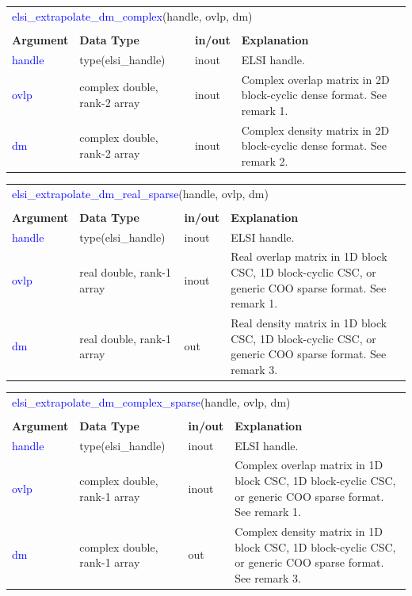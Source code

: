 \documentclass{report}
\newcommand{\tcb}[1]{\textcolor{blue}{#1}}
\begin{document}
\begin{tabular}[]{|p{20mm}|p{45mm}|p{15mm}|p{85mm}|}
\multicolumn{4}{l}{\tcb{elsi\_extrapolate\_dm\_complex}(handle, ovlp, dm)}\\
\multicolumn{4}{l}{}\\
\hline
\multicolumn{1}{|l|}{\textbf{Argument}} & \multicolumn{1}{l|}{\textbf{Data Type}} & \multicolumn{1}{l|}{\textbf{in/out}} & \multicolumn{1}{l|}{\textbf{Explanation}}\\
\hline
\tcb{handle} & type(elsi\_handle)           & inout & ELSI handle.\\
\hline
\tcb{ovlp}   & complex double, rank-2 array & inout & Complex overlap matrix in 2D block-cyclic dense format. See remark 1.\\
\hline
\tcb{dm}     & complex double, rank-2 array & inout & Complex density matrix in 2D block-cyclic dense format. See remark 2.\\
\hline
\end{tabular}

\begin{tabular}[]{|p{20mm}|p{45mm}|p{15mm}|p{85mm}|}
\multicolumn{4}{l}{\tcb{elsi\_extrapolate\_dm\_real\_sparse}(handle, ovlp, dm)}\\
\multicolumn{4}{l}{}\\
\hline
\multicolumn{1}{|l|}{\textbf{Argument}} & \multicolumn{1}{l|}{\textbf{Data Type}} & \multicolumn{1}{l|}{\textbf{in/out}} & \multicolumn{1}{l|}{\textbf{Explanation}}\\
\hline
\tcb{handle} & type(elsi\_handle)        & inout & ELSI handle.\\
\hline
\tcb{ovlp}   & real double, rank-1 array & inout & Real overlap matrix in 1D block CSC, 1D block-cyclic CSC, or generic COO sparse format. See remark 1.\\
\hline
\tcb{dm}     & real double, rank-1 array & out   & Real density matrix in 1D block CSC, 1D block-cyclic CSC, or generic COO sparse format. See remark 3.\\
\hline
\end{tabular}

\begin{tabular}[]{|p{20mm}|p{45mm}|p{15mm}|p{85mm}|}
\multicolumn{4}{l}{\tcb{elsi\_extrapolate\_dm\_complex\_sparse}(handle, ovlp, dm)}\\
\multicolumn{4}{l}{}\\
\hline
\multicolumn{1}{|l|}{\textbf{Argument}} & \multicolumn{1}{l|}{\textbf{Data Type}} & \multicolumn{1}{l|}{\textbf{in/out}} & \multicolumn{1}{l|}{\textbf{Explanation}}\\
\hline
\tcb{handle} & type(elsi\_handle)           & inout & ELSI handle.\\
\hline
\tcb{ovlp}   & complex double, rank-1 array & inout & Complex overlap matrix in 1D block CSC, 1D block-cyclic CSC, or generic COO sparse format. See remark 1.\\
\hline
\tcb{dm}     & complex double, rank-1 array & out   & Complex density matrix in 1D block CSC, 1D block-cyclic CSC, or generic COO sparse format. See remark 3.\\
\hline
\end{tabular}
\end{document}
